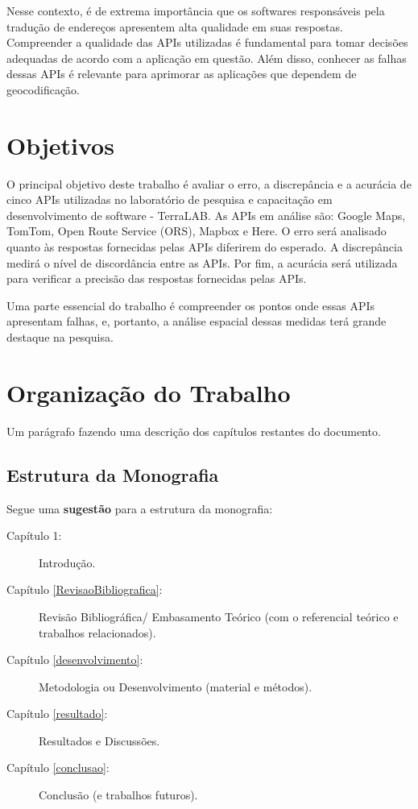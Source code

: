 Nesse contexto, é de extrema importância que os softwares responsáveis pela tradução de endereços apresentem alta qualidade em suas respostas. Compreender a qualidade das APIs utilizadas é fundamental para tomar decisões adequadas de acordo com a aplicação em questão. Além disso, conhecer as falhas dessas APIs é relevante para aprimorar as aplicações que dependem de geocodificação.

\section{Objetivos}

O principal objetivo deste trabalho é avaliar o erro, a discrepância e a acurácia de cinco APIs utilizadas no laboratório de pesquisa e capacitação em desenvolvimento de software - TerraLAB. As APIs em análise são: Google Maps, TomTom, Open Route Service (ORS), Mapbox e Here. O erro será analisado quanto às respostas fornecidas pelas APIs diferirem do esperado. A discrepância medirá o nível de discordância entre as APIs. Por fim, a acurácia será utilizada para verificar a precisão das respostas fornecidas pelas APIs.

Uma parte essencial do trabalho é compreender os pontos onde essas APIs apresentam falhas, e, portanto, a análise espacial dessas medidas terá grande destaque na pesquisa.

\section{Organização do Trabalho}

Um parágrafo fazendo uma descrição dos capítulos restantes do documento. 

\subsection{Estrutura da Monografia}

Segue uma \textbf{sugestão} para a estrutura da monografia: 

\begin{description}
   \item[Capítulo 1:] Introdução.
   \item[Capítulo \ref{RevisaoBibliografica}:] Revisão Bibliográfica/ Embasamento Teórico (com o referencial teórico e trabalhos relacionados).
   \item[Capítulo \ref{desenvolvimento}:] Metodologia ou Desenvolvimento (material e métodos).
   \item[Capítulo \ref{resultado}:] Resultados e Discussões.
   \item[Capítulo \ref{conclusao}:] Conclusão (e trabalhos futuros).
\end{description}


 









